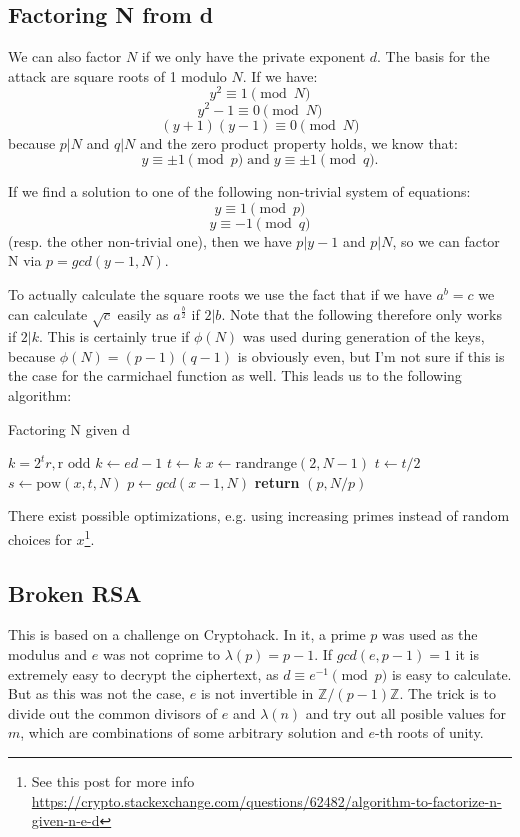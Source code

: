 \subsection{Factoring N from d}

We can also factor $N$ if we only have the private exponent $d$. The basis for the attack are square roots of 1 modulo $N$. If we have:
\[ y^2 \equiv 1 \pmod{N} \]
\[ y^2 - 1 \equiv 0 \pmod{N} \]
\[ (y+1)(y-1) \equiv 0 \pmod{N} \]
because $p | N$ and $q | N$ and the zero product property holds, we know that:
\[ y \equiv \pm 1 \pmod{p} \;\text{and}\; y \equiv \pm 1 \pmod{q}. \]

If we find a solution to one of the following non-trivial system of equations:
\[ y \equiv 1 \pmod{p} \]
\[ y \equiv -1 \pmod{q} \]
(resp. the other non-trivial one), then we have $p | y - 1$ and $p | N$, so we can factor N via $p = gcd(y - 1, N)$.

To actually calculate the square roots we use the fact that if we have $a^b = c$ we can calculate $\sqrt{c}$ easily as $a^{\frac{b}{2}}$ if $2 | b$. Note that the following therefore only works if $2 | k$. This is certainly true if $\phi(N)$ was used during generation of the keys, because $\phi(N) = (p-1)(q-1)$ is obviously even, but I'm not sure if this is the case for the carmichael function as well. This leads us to the following algorithm:

\begin{algorithm}
  \caption{Factoring N given d}
  \begin{algorithmic}
    \Ensure $k = 2^tr, \text{r odd}$
    \State $k \gets ed - 1$
    \Loop
    \State $t \gets k$
    \State $x \gets \text{randrange}(2, N-1)$
    \State $t \gets t/2$
    \State $s \gets \text{pow}(x, t, N)$
    \State $p \gets gcd(x - 1, N)$
    \State \textbf{return} $(p, N/p)$
    \EndIf
    \EndWhile
    \EndLoop
  \end{algorithmic}
\end{algorithm}

There exist possible optimizations, e.g. using increasing primes instead of random choices for $x$\footnote{See this post for more info \url{https://crypto.stackexchange.com/questions/62482/algorithm-to-factorize-n-given-n-e-d}}.


\subsection{Broken RSA}
This is based on a challenge on Cryptohack. In it, a prime $p$ was used as the modulus and $e$ was not coprime to $\lambda(p) = p - 1$. If $gcd(e, p-1) = 1$ it is extremely easy to decrypt the ciphertext, as $d \equiv e^{-1} \pmod{p}$ is easy to calculate. But as this was not the case, $e$ is not invertible in $\mathbb{Z}/(p-1)\mathbb{Z}$. The trick is to divide out the common divisors of $e$ and $\lambda(n)$ and try out all posible values for $m$, which are combinations of some arbitrary solution and $e$-th roots of unity.

